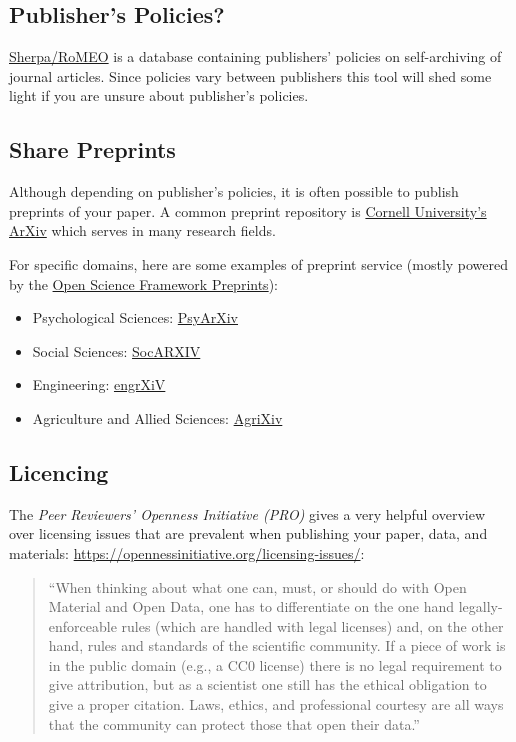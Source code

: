\documentclass[12pt,]{report}
\providecommand{\tightlist}{%
  \setlength{\itemsep}{0pt}\setlength{\parskip}{0pt}}
\begin{document}
\subsection{Publisher's Policies?}\label{publishers-policies}

\href{http://www.sherpa.ac.uk/romeo/index.php}{Sherpa/RoMEO} is a
database containing publishers' policies on self-archiving of journal
articles. Since policies vary between publishers this tool will shed
some light if you are unsure about publisher's policies.

\subsection{Share Preprints}\label{share-preprints}

Although depending on publisher's policies, it is often possible to
publish preprints of your paper. A common preprint repository is
\href{https://ArXiv.org}{Cornell University's ArXiv} which serves in
many research fields.

For specific domains, here are some examples of preprint service (mostly
powered by the \href{https://osf.io/preprints/}{Open Science Framework
Preprints}):

\begin{itemize}
\tightlist
\item
  Psychological Sciences:
  \href{https://osf.io/preprints/psyarxiv/}{PsyArXiv}
\item
  Social Sciences: \href{https://osf.io/preprints/socarxiv}{SocARXIV}
\item
  Engineering: \href{https://osf.io/preprints/engrxiv}{engrXiV}
\item
  Agriculture and Allied Sciences:
  \href{https://osf.io/preprints/agrixiv}{AgriXiv}
\end{itemize}

\subsection{Licencing}\label{licencing}

The \emph{Peer Reviewers' Openness Initiative (PRO)} gives a very
helpful overview over licensing issues that are prevalent when
publishing your paper, data, and materials:
\url{https://opennessinitiative.org/licensing-issues/}:

\begin{quote}
``When thinking about what one can, must, or should do with Open
Material and Open Data, one has to differentiate on the one hand
legally-enforceable rules (which are handled with legal licenses) and,
on the other hand, rules and standards of the scientific community. If a
piece of work is in the public domain (e.g., a CC0 license) there is no
legal requirement to give attribution, but as a scientist one still has
the ethical obligation to give a proper citation. Laws, ethics, and
professional courtesy are all ways that the community can protect those
that open their data.''
\end{quote}
\end{document}
